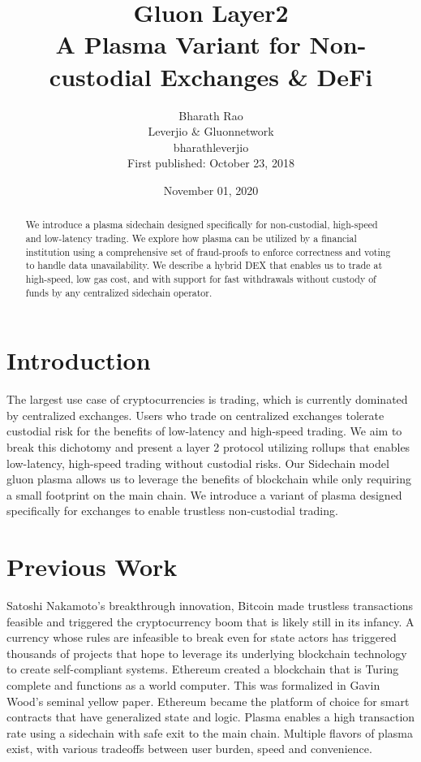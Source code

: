 \documentclass[12pt,a4paper]{article}
\title{Gluon Layer2 \\
\large A Plasma Variant for Non-custodial Exchanges \& DeFi}
\author{Bharath Rao \\
Leverj\svgperiod io \& Gluon\svgperiod network\\
bharath\svgat leverj\svgperiod io \\
\tiny First published: October 23, 2018}
\date{November 01, 2020}
\begin{document}
\maketitle

\begin{abstract}

        We introduce a plasma sidechain designed specifically for non-custodial, high-speed and low-latency trading. We explore how plasma can be utilized by a financial institution using a comprehensive set of fraud-proofs to enforce correctness and voting to handle data unavailability. We describe a hybrid DEX that enables us to trade at high-speed, low gas cost, and with support for fast withdrawals without custody of funds by any centralized sidechain operator.
\end{abstract}

\section{Introduction}

The largest use case of cryptocurrencies is trading, which is currently dominated by centralized exchanges. Users who trade on centralized exchanges tolerate custodial risk for the benefits of low-latency and high-speed trading. We aim to break this dichotomy and present a layer 2 protocol utilizing rollups that enables low-latency, high-speed trading without custodial risks. Our Sidechain model gluon plasma allows us to leverage the benefits of blockchain while only requiring a small footprint on the main chain. We introduce a variant of plasma designed specifically for exchanges to enable trustless non-custodial trading.

\section{Previous Work}

 Satoshi Nakamoto’s breakthrough innovation, Bitcoin\cite{Nak09} made trustless transactions feasible and triggered the cryptocurrency boom that is likely still in its infancy. A currency whose rules are infeasible to break even for state actors has triggered thousands of projects that hope to leverage its underlying blockchain technology to create self-compliant systems. Ethereum\cite{Eth14} created a blockchain that is Turing complete and functions as a world computer. This was formalized in Gavin Wood’s seminal yellow paper\cite{Gav15}. Ethereum became the platform of choice for smart contracts that have generalized state and logic. Plasma\cite{PB17} enables a high transaction rate using a sidechain with safe exit to the main chain. Multiple flavors of plasma exist, with various tradeoffs between user burden, speed and convenience.
\end{document}
